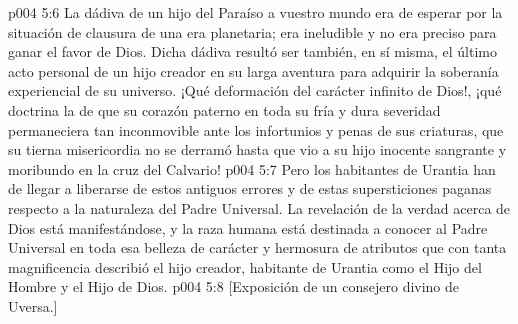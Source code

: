 \vs p004 5:6 La dádiva de un hijo del Paraíso a vuestro mundo era de esperar por la situación de clausura de una era planetaria; era ineludible y no era preciso para ganar el favor de Dios. Dicha dádiva resultó ser también, en sí misma, el último acto personal de un hijo creador en su larga aventura para adquirir la soberanía experiencial de su universo. ¡Qué deformación del carácter infinito de Dios!, ¡qué doctrina la de que su corazón paterno en toda su fría y dura severidad permaneciera tan inconmovible ante los infortunios y penas de sus criaturas, que su tierna misericordia no se derramó hasta que vio a su hijo inocente sangrante y moribundo en la cruz del Calvario!
\vs p004 5:7 Pero los habitantes de Urantia han de llegar a liberarse de estos antiguos errores y de estas supersticiones paganas respecto a la naturaleza del Padre Universal. La revelación de la verdad acerca de Dios está manifestándose, y la raza humana está destinada a conocer al Padre Universal en toda esa belleza de carácter y hermosura de atributos que con tanta magnificencia describió el hijo creador, habitante de Urantia como el Hijo del Hombre y el Hijo de Dios.
\vsetoff
\vs p004 5:8 [Exposición de un consejero divino de Uversa.]
